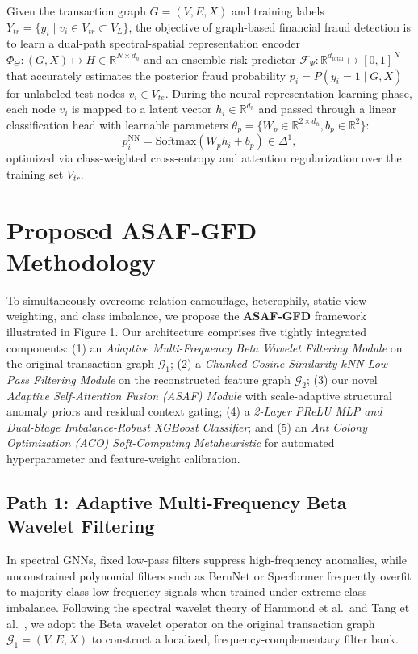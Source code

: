 \documentclass[10pt,a4paper,twocolumn]{article}
\begin{document}
Given the transaction graph $G = (V, E, X)$ and training labels $Y_{tr} = \{y_i \mid v_i \in V_{tr} \subset V_L\}$, the objective of graph-based financial fraud detection is to learn a dual-path spectral-spatial representation encoder $\Phi_\Theta : (G, X) \mapsto H \in \mathbb{R}^{N \times d_h}$ and an ensemble risk predictor $\mathscr{F}_\Psi : \mathbb{R}^{d_{\text{total}}} \mapsto [0, 1]^N$ that accurately estimates the posterior fraud probability $p_i = P(y_i = 1 \mid G, X)$ for unlabeled test nodes $v_i \in V_{te}$. During the neural representation learning phase, each node $v_i$ is mapped to a latent vector $h_i \in \mathbb{R}^{d_h}$ and passed through a linear classification head with learnable parameters $\theta_p = \{W_p \in \mathbb{R}^{2 \times d_h}, b_p \in \mathbb{R}^2\}$:
\begin{equation}
  p_i^{\text{NN}} = \text{Softmax}(W_p h_i + b_p) \in \Delta^1,
\end{equation}
optimized via class-weighted cross-entropy and attention regularization over the training set $V_{tr}$.

\section{Proposed ASAF-GFD Methodology}

To simultaneously overcome relation camouflage, heterophily, static view weighting, and class imbalance, we propose the \textbf{ASAF-GFD} framework illustrated in Figure 1. Our architecture comprises five tightly integrated components: (1) an \textit{Adaptive Multi-Frequency Beta Wavelet Filtering Module} on the original transaction graph $\mathscr{G}_1$; (2) a \textit{Chunked Cosine-Similarity $k$NN Low-Pass Filtering Module} on the reconstructed feature graph $\mathscr{G}_2$; (3) our novel \textit{Adaptive Self-Attention Fusion (ASAF) Module} with scale-adaptive structural anomaly priors and residual context gating; (4) a \textit{2-Layer PReLU MLP and Dual-Stage Imbalance-Robust XGBoost Classifier}; and (5) an \textit{Ant Colony Optimization (ACO) Soft-Computing Metaheuristic} for automated hyperparameter and feature-weight calibration.

\subsection{Path 1: Adaptive Multi-Frequency Beta Wavelet Filtering}

In spectral GNNs, fixed low-pass filters suppress high-frequency anomalies, while unconstrained polynomial filters such as BernNet \cite{ref30} or Specformer \cite{ref31} frequently overfit to majority-class low-frequency signals when trained under extreme class imbalance. Following the spectral wavelet theory of Hammond et al.\ and Tang et al.\ \cite{ref32}, we adopt the Beta wavelet operator on the original transaction graph $\mathscr{G}_1 = (V, E, X)$ to construct a localized, frequency-complementary filter bank.
\end{document}
